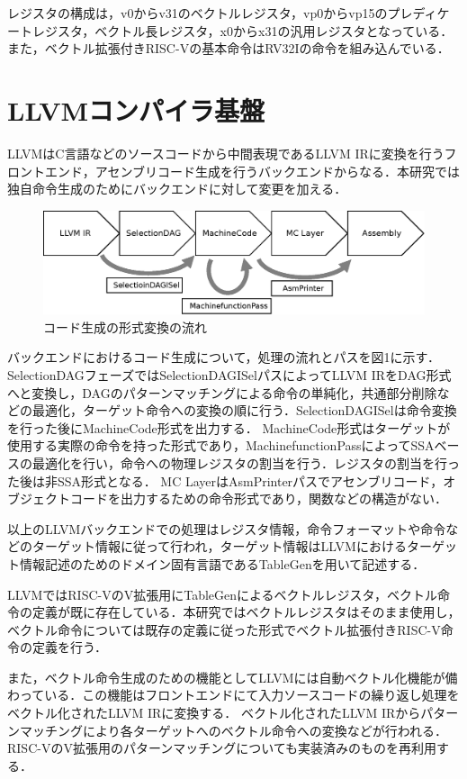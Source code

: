 \documentclass[a4paper,9pt, twocolumn]{jarticle}
\begin{document}
レジスタの構成は，v0からv31のベクトルレジスタ，vp0からvp15のプレディケートレジスタ，ベクトル長レジスタ，x0からx31の汎用レジスタとなっている．
また，ベクトル拡張付きRISC-Vの基本命令はRV32Iの命令を組み込んでいる．

\section{LLVMコンパイラ基盤}
LLVMはC言語などのソースコードから中間表現であるLLVM IRに変換を行うフロントエンド，アセンブリコード生成を行うバックエンドからなる．本研究では独自命令生成のためにバックエンドに対して変更を加える．

\begin{figure}[t]
    \centering
        \includegraphics[scale=0.4]{backend.eps}
    \caption{コード生成の形式変換の流れ}
    \label{fig:backend}
\end{figure}

バックエンドにおけるコード生成について，処理の流れとパスを図1に示す．
SelectionDAGフェーズではSelectionDAGISelパスによってLLVM IRをDAG形式へと変換し，DAGのパターンマッチングによる命令の単純化，共通部分削除などの最適化，ターゲット命令への変換の順に行う．SelectionDAGISelは命令変換を行った後にMachineCode形式を出力する．
MachineCode形式はターゲットが使用する実際の命令を持った形式であり，MachinefunctionPassによってSSAベースの最適化を行い，命令への物理レジスタの割当を行う．レジスタの割当を行った後は非SSA形式となる．
MC LayerはAsmPrinterパスでアセンブリコード，オブジェクトコードを出力するための命令形式であり，関数などの構造がない．

以上のLLVMバックエンドでの処理はレジスタ情報，命令フォーマットや命令などのターゲット情報に従って行われ，ターゲット情報はLLVMにおけるターゲット情報記述のためのドメイン固有言語であるTableGenを用いて記述する．

LLVMではRISC-VのV拡張用にTableGenによるベクトルレジスタ，ベクトル命令の定義が既に存在している．本研究ではベクトルレジスタはそのまま使用し，ベクトル命令については既存の定義に従った形式でベクトル拡張付きRISC-V命令の定義を行う．

また，ベクトル命令生成のための機能としてLLVMには自動ベクトル化機能が備わっている．この機能はフロントエンドにて入力ソースコードの繰り返し処理をベクトル化されたLLVM IRに変換する．
ベクトル化されたLLVM IRからパターンマッチングにより各ターゲットへのベクトル命令への変換などが行われる．RISC-VのV拡張用のパターンマッチングについても実装済みのものを再利用する．
\end{document}
